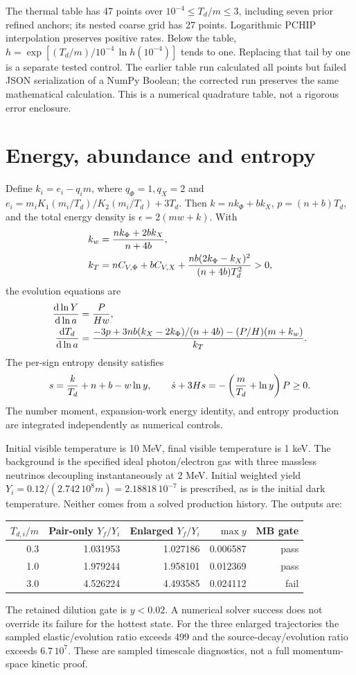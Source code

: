 \documentclass[11pt]{article}
\newcommand{\dd}{\mathrm d}
\begin{document}
The thermal table has 47 points over $10^{-4}\leq T_d/m\leq3$,
including seven prior refined anchors; its nested coarse grid has 27 points.
Logarithmic PCHIP interpolation preserves positive rates. Below the table,
$h=\exp[(T_d/m)/10^{-4}\,\ln h(10^{-4})]$ tends to one. Replacing
that tail by one is a separate tested control. The earlier table run
calculated all points but failed JSON serialization of a NumPy Boolean;
the corrected run preserves the same mathematical calculation. This is
a numerical quadrature table, not a rigorous error enclosure.

\section{Energy, abundance and entropy}
Define $k_i=e_i-q_i m$, where $q_\Phi=1,q_X=2$ and
$e_i=m_iK_1(m_i/T_d)/K_2(m_i/T_d)+3T_d$.
Then $k=nk_\Phi+bk_X$, $p=(n+b)T_d$, and the total energy density
is $\epsilon=2(mw+k)$. With
\begin{align}
 k_w&={nk_\Phi+2bk_X\over n+4b},\\
 k_T&=nC_{V,\Phi}+bC_{V,X}
       +{nb(2k_\Phi-k_X)^2\over(n+4b)T_d^2}>0,
\end{align}
the evolution equations are
\begin{align}
 {\dd\ln Y\over\dd\ln a}&={P\over Hw},\\
 {\dd T_d\over\dd\ln a}&={-3p+3nb(k_X-2k_\Phi)/(n+4b)
                      -(P/H)(m+k_w)\over k_T}.
\end{align}
The per-sign entropy density satisfies
\begin{equation}
 s={k\over T_d}+n+b-w\ln y,\qquad
 \dot s+3Hs=-\left({m\over T_d}+\ln y\right)P\geq0.
\end{equation}
The number moment, expansion-work energy identity, and entropy production
are integrated independently as numerical controls.

Initial visible temperature is 10 MeV, final visible temperature is 1 keV.
The background is the specified ideal photon/electron gas with three
massless neutrinos decoupling instantaneously at 2 MeV. Initial weighted
yield $Y_i=0.12/(2.742\,10^8m)=2.18818\,10^{-7}$ is prescribed,
as is the initial dark temperature. Neither comes from a solved production
history. The outputs are:
\begin{center}
\begin{tabular}{rrrrr}
\toprule
$T_{d,i}/m$ & Pair-only $Y_f/Y_i$ & Enlarged $Y_f/Y_i$ & $\max y$ & MB gate\\
\midrule
0.3 & 1.031953 & 1.027186 & 0.006587 & pass\\
1.0 & 1.979244 & 1.958101 & 0.012369 & pass\\
3.0 & 4.526224 & 4.493585 & 0.024112 & fail\\
\bottomrule
\end{tabular}
\end{center}
The retained dilution gate is $y<0.02$. A numerical solver success does
not override its failure for the hottest state. For the three enlarged
trajectories the sampled elastic/evolution ratio exceeds 499 and the
source-decay/evolution ratio exceeds $6.7\,10^7$. These are sampled
timescale diagnostics, not a full momentum-space kinetic proof.
\end{document}
